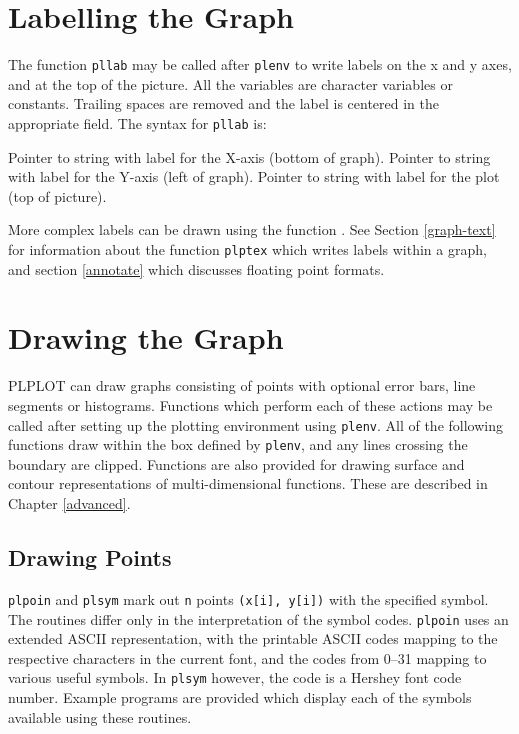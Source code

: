 
\section {Labelling the Graph}

The function {\tt pllab} may be called after {\tt plenv} to write labels
on the x and y axes, and at the top of the picture. All the
variables are character variables or constants. Trailing spaces
are removed and the label is centered in the appropriate field.
The syntax for {\tt pllab} is:

{Pointer to string with label for the X-axis (bottom of graph).}
{Pointer to string with label for the Y-axis (left of graph).}
{Pointer to string with label for the plot (top of picture).}

More complex labels can be drawn using the function .  See
Section \ref{graph-text} for information about the function {\tt plptex}
which writes labels within a graph, and section \ref{annotate} which
discusses floating point formats.


\section {Drawing the Graph}

PLPLOT can draw graphs consisting of points with optional error bars, 
line segments or histograms. Functions which perform each of these
actions may be called after setting up the plotting environment
using {\tt plenv}. All of the following functions draw within the box
defined by {\tt plenv}, and any lines crossing the boundary are clipped.
Functions are also provided for drawing surface and contour representations
of multi-dimensional functions. These are described in
Chapter \ref{advanced}.

\subsection {Drawing Points}
{\tt plpoin} and {\tt plsym} mark out {\tt n} points
{\tt (x[i], y[i])} with the
specified symbol. The routines differ only in the interpretation
of the symbol
codes. {\tt plpoin} uses an extended ASCII representation, with the
printable
ASCII codes mapping to the respective characters in the current font, and
the codes from 0--31 mapping to various useful symbols.
In {\tt plsym} however, 
the code is a Hershey font code number. Example programs are provided
which display each of the symbols available using these routines.

